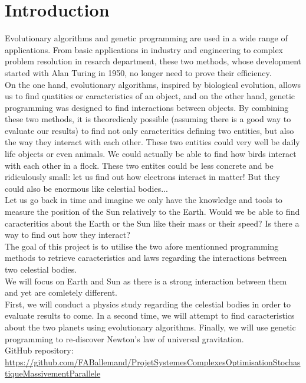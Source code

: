 \section{Introduction}
Evolutionary algorithms and genetic programming are used in a wide range of
applications. From basic applications in industry and engineering to complex
problem resolution in resarch department, these two methods, whose development
started with Alan Turing in 1950, no longer need to prove their efficiency.\\


On the one hand, evolutionary algorithms, inspired by biological evolution,
allows us to find quatities or caracteristics of an object, and on the other
hand, genetic programming was designed to find interactions between objects. By
combining these two methods, it is theoredicaly possible (assuming there is a
good way to evaluate our results) to find not only caracteritics defining two
entities, but also the way they interact with each other.
These two entities could very well be daily life objects or even animals. We
could actually be able to find how birds interact with each other in a flock.
These two entites could be less concrete and be ridiculously small: let us find
out how electrons interact in matter! But they could also be enormous like
celestial bodies...\\

Let us go back in time and imagine we only have the knowledge and tools to
measure the position of the Sun relatively to the Earth. Would we be able to
find caracteritics about the Earth or the Sun like their mass or their speed?
Is there a way to find out how they interact?\\

The goal of this project is to utilise the two afore mentionned programming
methods to retrieve caracteristics and laws regarding the interactions between
two celestial bodies.\\
We will focus on Earth and Sun as there is a strong interaction between them
and yet are comletely different.\\
First, we will conduct a physics study regarding the celestial bodies in order
to evaluate results to come.
In a second time, we will attempt to find caracteristics about the two planets using
evolutionary algorithms. Finally, we will use genetic programming to
re-discover Newton's law of universal gravitation.\\


GitHub repository: \url{https://github.com/FABallemand/ProjetSystemesComplexesOptimisationStochastiqueMassivementParallele}